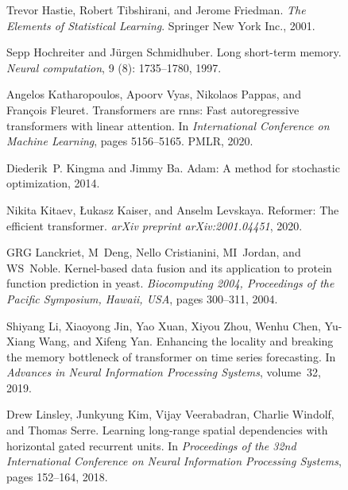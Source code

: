 \documentclass{article}
\begin{document}
\begin{figure}[t]
\begin{center}
\begin{thebibliography}{29}
Trevor Hastie, Robert Tibshirani, and Jerome Friedman.
\newblock \emph{The Elements of Statistical Learning}.
\newblock Springer New York Inc., 2001.

Sepp Hochreiter and J{\"u}rgen Schmidhuber.
\newblock Long short-term memory.
\newblock \emph{Neural computation}, 9 (8): 1735--1780, 1997.

Angelos Katharopoulos, Apoorv Vyas, Nikolaos Pappas, and Fran{\c{c}}ois
  Fleuret.
\newblock Transformers are rnns: Fast autoregressive transformers with linear
  attention.
\newblock In \emph{International Conference on Machine Learning}, pages
  5156--5165. PMLR, 2020.

Diederik~P. Kingma and Jimmy Ba.
\newblock Adam: A method for stochastic optimization, 2014.

Nikita Kitaev, {\L}ukasz Kaiser, and Anselm Levskaya.
\newblock Reformer: The efficient transformer.
\newblock \emph{arXiv preprint arXiv:2001.04451}, 2020.

GRG Lanckriet, M~Deng, Nello Cristianini, MI~Jordan, and WS~Noble.
\newblock Kernel-based data fusion and its application to protein function
  prediction in yeast.
\newblock \emph{Biocomputing 2004, Proceedings of the Pacific Symposium,
  Hawaii, USA}, pages 300--311, 2004.

Shiyang Li, Xiaoyong Jin, Yao Xuan, Xiyou Zhou, Wenhu Chen, Yu-Xiang Wang, and
  Xifeng Yan.
\newblock Enhancing the locality and breaking the memory bottleneck of
  transformer on time series forecasting.
\newblock In \emph{Advances in Neural Information Processing Systems},
  volume~32, 2019.

Drew Linsley, Junkyung Kim, Vijay Veerabadran, Charlie Windolf, and Thomas
  Serre.
\newblock Learning long-range spatial dependencies with horizontal gated
  recurrent units.
\newblock In \emph{Proceedings of the 32nd International Conference on Neural
  Information Processing Systems}, pages 152--164, 2018.


\end{thebibliography}
\end{center}
\end{figure}
\end{document}
